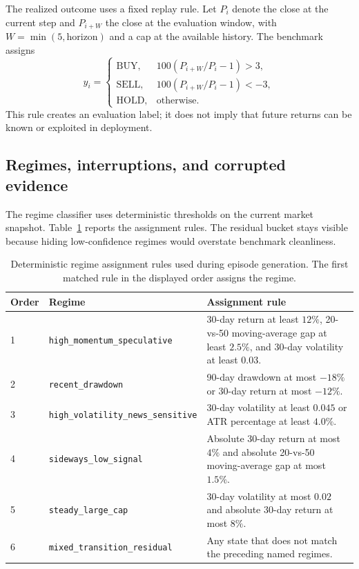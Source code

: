 \documentclass[10pt,twocolumn]{article}
\begin{document}
The realized outcome uses a fixed replay rule. Let \(P_i\) denote the close at the current step and \(P_{i+W}\) the close at the evaluation window, with \(W=\min(5,\mathrm{horizon})\) and a cap at the available history. The benchmark assigns
\begin{equation}
y_i =
\begin{cases}
\mathrm{BUY}, & 100(P_{i+W}/P_i - 1) > 3,\\
\mathrm{SELL}, & 100(P_{i+W}/P_i - 1) < -3,\\
\mathrm{HOLD}, & \text{otherwise.}
\end{cases}
\label{eq:realized-outcome}
\end{equation}
This rule creates an evaluation label; it does not imply that future returns can be known or exploited in deployment.

\subsection{Regimes, interruptions, and corrupted evidence}

The regime classifier uses deterministic thresholds on the current market snapshot. Table~\ref{tab:regime-rules} reports the assignment rules. The residual bucket stays visible because hiding low-confidence regimes would overstate benchmark cleanliness.

\begin{table}[t]
\centering
\caption{Deterministic regime assignment rules used during episode generation. The first matched rule in the displayed order assigns the regime.}
\label{tab:regime-rules}
\small
\begin{tabularx}{\textwidth}{llX}
\toprule
Order & Regime & Assignment rule \\
\midrule
1 & \texttt{high\_momentum\_speculative} & 30-day return at least \(12\%\), 20-vs-50 moving-average gap at least \(2.5\%\), and 30-day volatility at least \(0.03\). \\
2 & \texttt{recent\_drawdown} & 90-day drawdown at most \(-18\%\) or 30-day return at most \(-12\%\). \\
3 & \texttt{high\_volatility\_news\_sensitive} & 30-day volatility at least \(0.045\) or ATR percentage at least \(4.0\%\). \\
4 & \texttt{sideways\_low\_signal} & Absolute 30-day return at most \(4\%\) and absolute 20-vs-50 moving-average gap at most \(1.5\%\). \\
5 & \texttt{steady\_large\_cap} & 30-day volatility at most \(0.02\) and absolute 30-day return at most \(8\%\). \\
6 & \texttt{mixed\_transition\_residual} & Any state that does not match the preceding named regimes. \\
\bottomrule
\end{tabularx}
\end{table}
\end{document}
